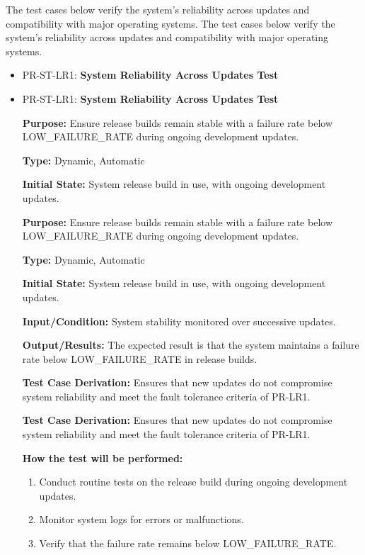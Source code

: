 \documentclass[12pt, titlepage]{article}
\begin{document}
\vspace{1em}
\hspace{2em}The test cases below verify the system’s reliability across updates and compatibility with major operating systems.
\vspace{1em}
\hspace{2em}The test cases below verify the system’s reliability across updates and compatibility with major operating systems.

\begin{itemize}
  \item PR-ST-LR1: \textbf{System Reliability Across Updates Test}
  \item PR-ST-LR1: \textbf{System Reliability Across Updates Test}
  \begin{mdframed}[linewidth=0.5mm]
      \textbf{Purpose:} Ensure release builds remain stable with a failure rate below \\ LOW\_FAILURE\_RATE during ongoing development updates. \par
      \textbf{Type:} Dynamic, Automatic \par
      \textbf{Initial State:} System release build in use, with ongoing development updates. \par
      \textbf{Purpose:} Ensure release builds remain stable with a failure rate below \\ LOW\_FAILURE\_RATE during ongoing development updates. \par
      \textbf{Type:} Dynamic, Automatic \par
      \textbf{Initial State:} System release build in use, with ongoing development updates. \par
      \textbf{Input/Condition:} System stability monitored over successive updates. \par
      \textbf{Output/Results:} The expected result is that the system maintains a failure rate below LOW\_FAILURE\_RATE in release builds. \par
      \textbf{Test Case Derivation:} Ensures that new updates do not compromise system reliability and meet the fault tolerance criteria of PR-LR1. \par
      \textbf{Test Case Derivation:} Ensures that new updates do not compromise system reliability and meet the fault tolerance criteria of PR-LR1. \par
      \textbf{How the test will be performed:}
      \begin{enumerate}[noitemsep]
        \item Conduct routine tests on the release build during ongoing development updates.
        \item Monitor system logs for errors or malfunctions.
        \item Verify that the failure rate remains below LOW\_FAILURE\_RATE.
      \end{enumerate}
  \end{mdframed}


\end{itemize}
\end{document}
